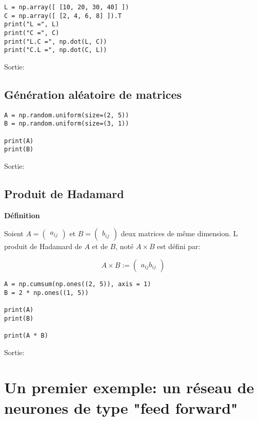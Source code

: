 \documentclass[11pt]{article}
\begin{document}
\begin{verbatim}
L = np.array([ [10, 20, 30, 40] ])
C = np.array([ [2, 4, 6, 8] ]).T
print("L =", L)
print("C =", C)
print("L.C =", np.dot(L, C))
print("C.L =", np.dot(C, L))
\end{verbatim}

Sortie:

\subsection{Génération aléatoire de matrices}
\label{sec-4-3}

\begin{verbatim}
A = np.random.uniform(size=(2, 5))
B = np.random.uniform(size=(3, 1))

print(A)
print(B)
\end{verbatim}

Sortie:

\subsection{Produit de Hadamard}
\label{sec-4-4}

\textbf{Définition}

Soient $A=\begin{pmatrix}a_{ij}\end{pmatrix}$ et
$B=\begin{pmatrix}b_{ij}\end{pmatrix}$ deux matrices de même dimension. L
produit de Hadamard de $A$ et de $B$, noté $A\times B$ est défini par:

\begin{equation}
A\times B := \begin{pmatrix}a_{ij}b_{ij}\end{pmatrix}
\end{equation}

\begin{verbatim}
A = np.cumsum(np.ones((2, 5)), axis = 1)
B = 2 * np.ones((1, 5))

print(A)
print(B)

print(A * B)
\end{verbatim}

Sortie:


\section{Un premier exemple: un réseau de neurones de type "feed forward"}
\label{sec-5}
\end{document}
